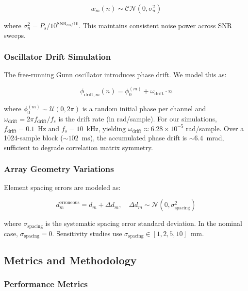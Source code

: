 \documentclass[10pt,a4paper]{article}
\begin{document}
\begin{equation}
w_m(n) \sim \mathcal{CN}(0, \sigma_n^2)
\end{equation}

where $\sigma_n^2 = P_s / 10^{\text{SNR}_{\text{dB}}/10}$. This maintains consistent noise power across SNR sweeps.

\subsubsection{Oscillator Drift Simulation}

The free-running Gunn oscillator introduces phase drift. We model this as:

\begin{equation}
\phi_{\text{drift},m}(n) = \phi_0^{(m)} + \omega_{\text{drift}} \cdot n
\end{equation}

where $\phi_0^{(m)} \sim \mathcal{U}(0, 2\pi)$ is a random initial phase per channel and $\omega_{\text{drift}} = 2\pi f_{\text{drift}} / f_s$
is the drift rate (in rad/sample). For our simulations, $f_{\text{drift}} = 0.1$~Hz and $f_s = 10$~kHz,
yielding $\omega_{\text{drift}} \approx 6.28 \times 10^{-5}$ rad/sample. Over a 1024-sample block ($\sim 102$~ms),
the accumulated phase drift is $\sim 6.4$~mrad, sufficient to degrade correlation matrix symmetry.

\subsubsection{Array Geometry Variations}

Element spacing errors are modeled as:

\begin{equation}
d_m^{\text{erroneous}} = d_m + \Delta d_m, \quad \Delta d_m \sim \mathcal{N}(0, \sigma_{\text{spacing}}^2)
\end{equation}

where $\sigma_{\text{spacing}}$ is the systematic spacing error standard deviation. In the nominal case,
$\sigma_{\text{spacing}} = 0$. Sensitivity studies use $\sigma_{\text{spacing}} \in [1, 2, 5, 10]$~mm.

\subsection{Metrics and Methodology}

\subsubsection{Performance Metrics}
\end{document}
